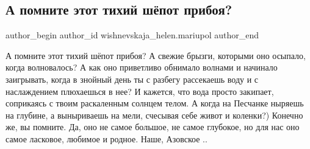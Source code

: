  
 
 
 
 

\subsection{А помните этот тихий шёпот прибоя?}
\label{sec:29_12_2022.fb.wishnevskaja_helen.mariupol.1.a_pomnite_etot_tikhi}

\ifcmt
 author_begin
   author_id wishnevskaja_helen.mariupol
 author_end
\fi

А помните этот тихий шёпот прибоя? А свежие брызги, которыми оно осыпало, когда
волновалось? А как оно приветливо обнимало волнами и начинало заигрывать, когда
в знойный день ты с разбегу  рассекаешь воду и с наслаждением плюхаешься в нее?
И кажется,  что вода просто закипает, соприкаясь с твоим раскаленным  солнцем
телом.  А когда на Песчанке ныряешь на глубине,  а выныриваешь на мели,
счесывая себе живот и коленки?) Конечно же, вы помните. Да, оно не самое
большое,  не самое глубокое,  но для нас оно самое ласковое, любимое и родное.
Наше, Азовское ..

